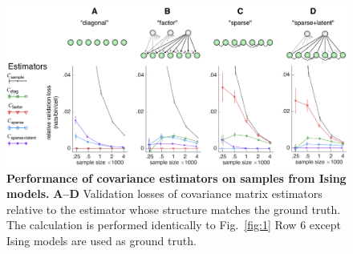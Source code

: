 \begin{figure}
\begin{fullpage}
	\begin{center}
    \includegraphics[width=\textwidth]{./figures/Figure2.png}
    \end{center}
\caption[Performance of covariance estimators on samples from Ising models]
{{\bf Performance of covariance estimators on samples from Ising models.}
{\bf A--D} Validation losses of covariance matrix estimators relative to the estimator whose structure matches the ground truth. The calculation is performed identically to Fig.~\ref{fig:1} Row 6 except Ising models are used as ground truth. 
}\label{fig:2}
\end{fullpage}
\end{figure}